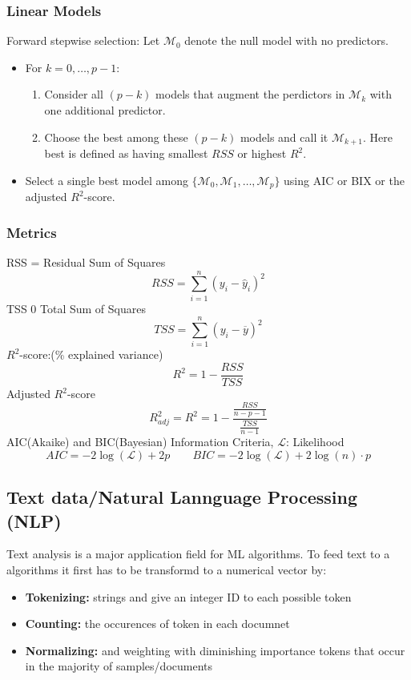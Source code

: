 \subsubsection*{Linear Models}
Forward stepwise selection:
Let \(\mathcal{M}_0\) denote the null model with no predictors.
\begin{itemize}
    \item For \(k = 0,\dots,p-1\):
    \begin{enumerate}
        \item Consider all \((p-k)\) models that augment the perdictors in \(\mathcal{M}_k\) with one additional predictor.
        \item Choose the best among these \((p-k)\) models and call it \(\mathcal{M}_{k + 1}\). Here best is defined as having smallest \(RSS\) or highest \(R^2\).
    \end{enumerate}
    \item Select a single best model among \(\{\mathcal{M}_{0},\mathcal{M}_{1},\dots,\mathcal{M}_{p}\}\) using AIC or BIX or the adjusted \(R^2\)-score.
\end{itemize}
\subsubsection*{Metrics}
RSS = Residual Sum of Squares
\[
RSS = \sum_{i = 1}^{n}(y_i-\hat{y}_i)^2
\]
TSS 0 Total Sum of Squares
\[
    TSS = \sum_{i = 1}^{n}(y_i-\overline{y})^2
\]
\(R^2\)-score:(\% explained variance)
\[
R^2 = 1- \frac{RSS}{TSS}
\]
Adjusted \(R^2\)-score
\[
R^2_{adj} = R^2 = 1- \frac{\frac{RSS}{n-p-1}}{\frac{TSS}{n-1}}
\]
AIC(Akaike) and BIC(Bayesian) Information Criteria, \(\mathcal{L}\): Likelihood
\[
AIC = -2\log(\mathcal{L}) + 2p \qquad BIC = -2\log(\mathcal{L}) + 2\log(n) \cdot p
\]

\subsection{Text data/Natural Lannguage Processing (NLP)}
Text analysis is a major application field for ML algorithms.
To feed text to a algorithms it first has to be transformd to a numerical vector by:
\begin{itemize}
    \item \textbf{Tokenizing:} strings and give an integer ID to each possible token
    \item \textbf{Counting:} the occurences of token in each documnet
    \item \textbf{Normalizing:} and weighting with diminishing importance tokens that occur in the majority of samples/documents
\end{itemize}

